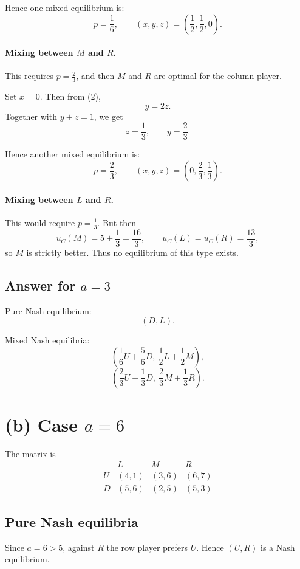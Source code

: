 Hence one mixed equilibrium is:
\[
p=\frac16,\qquad (x,y,z)=\left(\frac12,\frac12,0\right).
\]

\paragraph{Mixing between \(M\) and \(R\).}
This requires \(p=\frac23\), and then \(M\) and \(R\) are optimal for the column player.

Set \(x=0\). Then from (2),
\[
y=2z.
\]
Together with \(y+z=1\), we get
\[
z=\frac13,\qquad y=\frac23.
\]

Hence another mixed equilibrium is:
\[
p=\frac23,\qquad (x,y,z)=\left(0,\frac23,\frac13\right).
\]

\paragraph{Mixing between \(L\) and \(R\).}
This would require \(p=\frac13\). But then
\[
u_C(M)=5+\frac13=\frac{16}{3},
\qquad
u_C(L)=u_C(R)=\frac{13}{3},
\]
so \(M\) is strictly better. Thus no equilibrium of this type exists.

\subsection*{Answer for \(a=3\)}

Pure Nash equilibrium:
\[
(D,L).
\]

Mixed Nash equilibria:
\[
\left(\frac16 U+\frac56 D,\ \frac12 L+\frac12 M\right),
\]
\[
\left(\frac23 U+\frac13 D,\ \frac23 M+\frac13 R\right).
\]

\section*{(b) Case \(a=6\)}

The matrix is
\[
\begin{array}{c|ccc}
 & L & M & R\\
\hline
U & (4,1) & (3,6) & (6,7)\\
D & (5,6) & (2,5) & (5,3)
\end{array}
\]

\subsection*{Pure Nash equilibria}

Since \(a=6>5\), against \(R\) the row player prefers \(U\). Hence \((U,R)\) is a Nash equilibrium.

